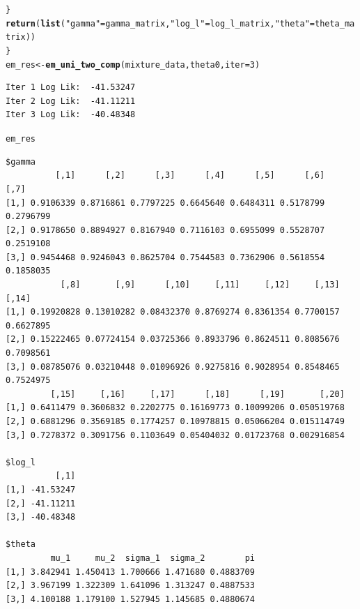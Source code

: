 \documentclass[10pt, a4paper, english]{article}\usepackage[]{graphicx}\usepackage[dvipsnames]{xcolor}
\makeatletter
\newcommand{\hlnum}[1]{\textcolor[rgb]{0.686,0.059,0.569}{#1}}%
\newcommand{\hlstr}[1]{\textcolor[rgb]{0.192,0.494,0.8}{#1}}%
\newcommand{\hlstd}[1]{\textcolor[rgb]{0.345,0.345,0.345}{#1}}%
\newcommand{\hlkwb}[1]{\textcolor[rgb]{0.69,0.353,0.396}{#1}}%
\newcommand{\hlkwc}[1]{\textcolor[rgb]{0.333,0.667,0.333}{#1}}%
\newcommand{\hlkwd}[1]{\textcolor[rgb]{0.737,0.353,0.396}{\textbf{#1}}}%
\newenvironment{kframe}{%
 \def\at@end@of@kframe{}%
 \ifinner\ifhmode%
  \def\at@end@of@kframe{\end{minipage}}%
  \begin{minipage}{\columnwidth}%
 \fi\fi%
 \def\FrameCommand##1{\hskip\@totalleftmargin \hskip-\fboxsep
 \colorbox{shadecolor}{##1}\hskip-\fboxsep
     \hskip-\linewidth \hskip-\@totalleftmargin \hskip\columnwidth}%
 \MakeFramed {\advance\hsize-\width
   \@totalleftmargin\z@ \linewidth\hsize
   \@setminipage}}%
 {\par\unskip\endMakeFramed%
 \at@end@of@kframe}
\newenvironment{knitrout}{}{} %
\makeatother
\begin{document}
\begin{knitrout}
\begin{kframe}
\begin{alltt}
  \hlstd{\}}
   \hlkwd{return}\hlstd{(}\hlkwd{list}\hlstd{(}\hlstr{"gamma"} \hlstd{= gamma_matrix,} \hlstr{"log_l"}\hlstd{= log_l_matrix,} \hlstr{"theta"}\hlstd{= theta_matrix))}
\hlstd{\}}
\hlstd{em_res} \hlkwb{<-} \hlkwd{em_uni_two_comp}\hlstd{(mixture_data, theta0,} \hlkwc{iter} \hlstd{=} \hlnum{3}\hlstd{)}
\end{alltt}
\begin{verbatim}
Iter 1 Log Lik:  -41.53247
Iter 2 Log Lik:  -41.11211
Iter 3 Log Lik:  -40.48348
\end{verbatim}
\begin{alltt}
\hlstd{em_res}
\end{alltt}
\begin{verbatim}
$gamma
          [,1]      [,2]      [,3]      [,4]      [,5]      [,6]      [,7]
[1,] 0.9106339 0.8716861 0.7797225 0.6645640 0.6484311 0.5178799 0.2796799
[2,] 0.9178650 0.8894927 0.8167940 0.7116103 0.6955099 0.5528707 0.2519108
[3,] 0.9454468 0.9246043 0.8625704 0.7544583 0.7362906 0.5618554 0.1858035
           [,8]       [,9]      [,10]     [,11]     [,12]     [,13]     [,14]
[1,] 0.19920828 0.13010282 0.08432370 0.8769274 0.8361354 0.7700157 0.6627895
[2,] 0.15222465 0.07724154 0.03725366 0.8933796 0.8624511 0.8085676 0.7098561
[3,] 0.08785076 0.03210448 0.01096926 0.9275816 0.9028954 0.8548465 0.7524975
         [,15]     [,16]     [,17]      [,18]      [,19]       [,20]
[1,] 0.6411479 0.3606832 0.2202775 0.16169773 0.10099206 0.050519768
[2,] 0.6881296 0.3569185 0.1774257 0.10978815 0.05066204 0.015114749
[3,] 0.7278372 0.3091756 0.1103649 0.05404032 0.01723768 0.002916854

$log_l
          [,1]
[1,] -41.53247
[2,] -41.11211
[3,] -40.48348

$theta
         mu_1     mu_2  sigma_1  sigma_2        pi
[1,] 3.842941 1.450413 1.700666 1.471680 0.4883709
[2,] 3.967199 1.322309 1.641096 1.313247 0.4887533
[3,] 4.100188 1.179100 1.527945 1.145685 0.4880674
\end{verbatim}
\end{kframe}
\end{knitrout}
\end{document}
